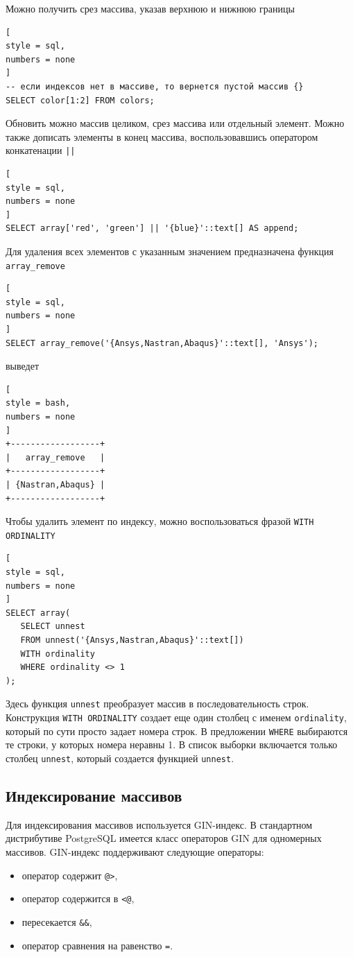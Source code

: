\documentclass[%
	11pt,
	a4paper,
	utf8,
		]{article}
\begin{document}
Можно получить срез массива, указав верхнюю и нижнюю границы
\begin{lstlisting}[
style = sql,
numbers = none
]
-- если индексов нет в массиве, то вернется пустой массив {}
SELECT color[1:2] FROM colors;
\end{lstlisting}

Обновить можно массив целиком, срез массива или отдельный элемент. Можно также дописать элементы в конец массива, воспользовавшись оператором конкатенации \texttt{||}
\begin{lstlisting}[
style = sql,
numbers = none
]
SELECT array['red', 'green'] || '{blue}'::text[] AS append;
\end{lstlisting}

Для удаления всех элементов с указанным значением предназначена функция \texttt{array\_remove}
\begin{lstlisting}[
style = sql,
numbers = none
]
SELECT array_remove('{Ansys,Nastran,Abaqus}'::text[], 'Ansys');
\end{lstlisting}
выведет
\begin{lstlisting}[
style = bash,
numbers = none
]
+------------------+
|   array_remove   |
+------------------+
| {Nastran,Abaqus} |
+------------------+
\end{lstlisting}

Чтобы удалить элемент по индексу, можно воспользоваться фразой \texttt{WITH ORDINALITY}
\begin{lstlisting}[
style = sql,
numbers = none
]
SELECT array(
   SELECT unnest
   FROM unnest('{Ansys,Nastran,Abaqus}'::text[])
   WITH ordinality
   WHERE ordinality <> 1
);
\end{lstlisting}

Здесь функция \texttt{unnest} преобразует массив в последовательность строк. Конструкция \texttt{WITH ORDINALITY} создает еще один столбец с именем \texttt{ordinality}, который по сути просто задает номера строк. В предложении \texttt{WHERE} выбираются те строки, у которых номера неравны 1. В список выборки включается только столбец \texttt{unnest}, который создается функцией \texttt{unnest}. 

\subsection{Индексирование массивов}

Для индексирования массивов используется GIN-индекс. В стандартном дистрибутиве PostgreSQL имеется класс операторов GIN для одномерных массивов. GIN-индекс поддерживают следующие операторы:
\begin{itemize}
	\item оператор содержит \verb|@>|,
	
	\item оператор содержится в \verb|<@|,
	
	\item пересекается \verb|&&|,
	
	\item оператор сравнения на равенство \verb|=|.
\end{itemize}
\end{document}
